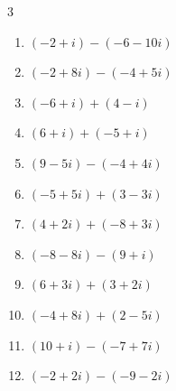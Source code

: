 \begin{multicols}{3}
\begin{enumerate}
        \phantom{$\displaystyle =-12i$}

  \item $\displaystyle (-2+i) - (-6-10i)$

        \phantom{$\displaystyle =4+11i$}

  \item $\displaystyle (-2+8i) - (-4+5i)$

        \phantom{$\displaystyle =2+3i$}

\columnbreak %

\resetques

  \item $\displaystyle (-6+i) + (4-i)$

        \phantom{$\displaystyle =-2$}

  \item $\displaystyle (6+i) + (-5+i)$

        \phantom{$\displaystyle =1+2i$}

  \item $\displaystyle (9-5i) - (-4+4i)$

        \phantom{$\displaystyle =13-9i$}

  \item $\displaystyle (-5+5i) + (3-3i)$

        \phantom{$\displaystyle =-2+2i$}

  \item $\displaystyle (4+2i) + (-8+3i)$

        \phantom{$\displaystyle =-4+5i$}

  \item $\displaystyle (-8-8i) - (9+i)$

        \phantom{$\displaystyle =-17-9i$}

  \item $\displaystyle (6+3i) + (3+2i)$

        \phantom{$\displaystyle =9+5i$}

  \item $\displaystyle (-4+8i) + (2-5i)$

        \phantom{$\displaystyle =-2+3i$}

  \item $\displaystyle (10+i) - (-7+7i)$

        \phantom{$\displaystyle =17-6i$}

  \item $\displaystyle (-2+2i) - (-9-2i)$

        \phantom{$\displaystyle =7+4i$}


\end{enumerate}
\end{multicols}
